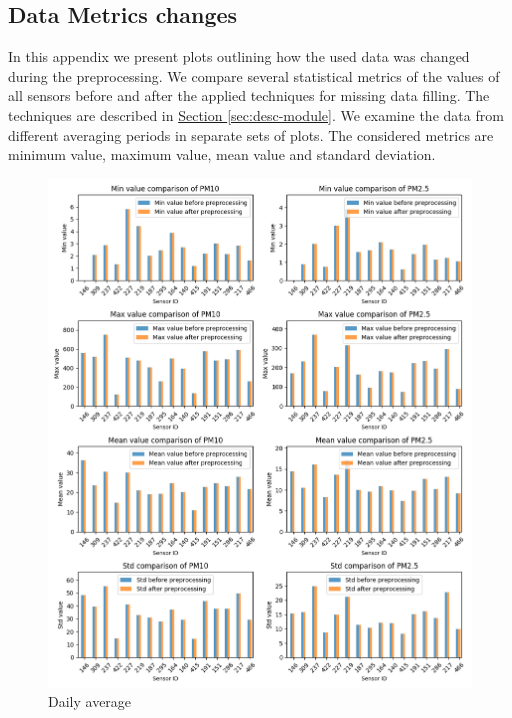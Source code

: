 \documentclass[12pt,a4paper,twoside]{scrartcl}
\numberwithin{equation}{section}
\newcommand{\refsec}[1]{\hyperref[#1]{Section \ref*{#1}}}
\newcounter{mypagecount}%
\newenvironment{interlude}{%
  \clearpage
  \setcounter{mypagecount}{\value{page}}%
  \thispagestyle{empty}%
  \pagestyle{empty}%
}{%
  \clearpage
  \setcounter{page}{\value{mypagecount}}%
}
\let\chapter=\section %
\begin{document}
\begin{interlude}
\begin{appendices}
    \chapter{Data Metrics changes}\label{app:b}
    In this appendix we present plots outlining how the used data was changed during the preprocessing. We compare several statistical metrics of the values of all sensors before and after the applied techniques for missing data filling. The techniques are described in \refsec{sec:desc-module}. We examine the data from different averaging periods in separate sets of plots. The considered metrics are minimum value, maximum value, mean value and standard deviation.
    \begin{center}
      \begin{figure}[h!] \centerline{\includegraphics[width=1.1\textwidth,height=1.1\textwidth]{figures/data_files_changes/1D_sensor_metrics}}
        \caption[Metrics change during preprocessing (one day average)]{Daily average}
      \end{figure}


\end{center}
\end{appendices}
\end{interlude}
\end{document}

